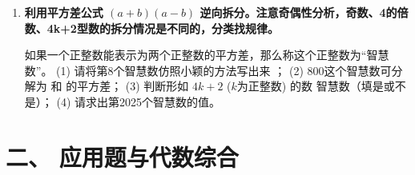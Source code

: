 \documentclass{ctexart}
\begin{document}
\begin{enumerate}
    \item \textbf{利用平方差公式 $(a+b)(a-b)$ 逆向拆分。注意奇偶性分析，奇数、4的倍数、4k+2型数的拆分情况是不同的，分类找规律。}
    
    如果一个正整数能表示为两个正整数的平方差，那么称这个正整数为“智慧数”。
    (1) 请将第8个智慧数仿照小颖的方法写出来 \underline{\hspace{2cm}}；
    (2) 800这个智慧数可分解为 \underline{\hspace{2cm}} 和 \underline{\hspace{2cm}} 的平方差；
    (3) 判断形如 $4k+2$ ($k$为正整数) 的数 \underline{\hspace{2cm}} 智慧数（填是或不是）；
    (4) 请求出第2025个智慧数的值。
    \vspace{2cm}
\end{enumerate}

\section*{二、 应用题与代数综合}
\end{document}
